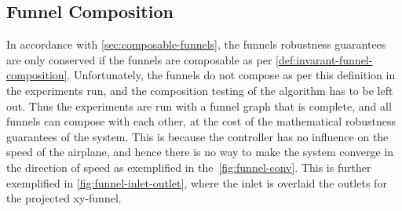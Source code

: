 \subsection{Funnel Composition}
\label{subsec:funnel-no-composable}

In accordance with \cref{sec:composable-funnels}, the funnels robustness
guarantees are only conserved if the funnels are composable as per
\cref{def:invarant-funnel-composition}. Unfortunately, the funnels do not
compose as per this definition in the experiments run, and the composition
testing of the algorithm has to be left out. Thus the experiments are run with a
funnel graph that is complete, and all funnels can compose with each other, at
the cost of the mathematical robustness guarantees of the system. This is
because the controller has no influence on the speed of the airplane, and hence
there is no way to make the system converge in the direction of speed as
exemplified in the~\cref{fig:funnel-conv}. This is further exemplified in
\cref{fig:funnel-inlet-outlet}, where the inlet is overlaid the outlets for the
projected xy-funnel.

